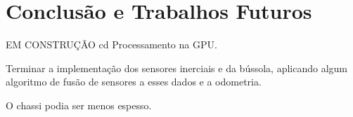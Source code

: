 \section{Conclusão e Trabalhos Futuros}
\label{sec:conclusao}

EM CONSTRUÇÃO
cd
Processamento na GPU.

Terminar a implementação dos sensores inerciais e da bússola, aplicando algum algoritmo de fusão de sensores a esses dados e a odometria.

O chassi podia ser menos espesso.
